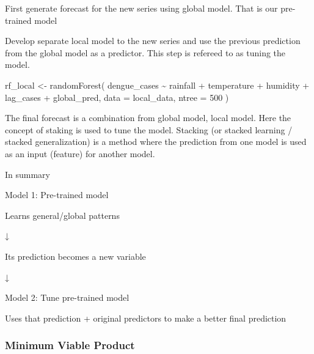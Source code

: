 \documentclass[
]{article}
\newenvironment{Shaded}{\begin{snugshade}}{\end{snugshade}}
\newcommand{\AttributeTok}[1]{\textcolor[rgb]{0.40,0.45,0.13}{#1}}
\newcommand{\DecValTok}[1]{\textcolor[rgb]{0.68,0.00,0.00}{#1}}
\newcommand{\FunctionTok}[1]{\textcolor[rgb]{0.28,0.35,0.67}{#1}}
\newcommand{\NormalTok}[1]{\textcolor[rgb]{0.00,0.23,0.31}{#1}}
\newcommand{\OtherTok}[1]{\textcolor[rgb]{0.00,0.23,0.31}{#1}}
\newcommand{\SpecialCharTok}[1]{\textcolor[rgb]{0.37,0.37,0.37}{#1}}
\begin{document}
First generate forecast for the new series using global model. That is
our pre-trained model

\begin{Shaded}
\end{Shaded}

Develop separate local model to the new series and use the previous
prediction from the global model as a predictor. This step is refereed
to as tuning the model.

\begin{Shaded}
\begin{Highlighting}[]
\NormalTok{rf\_local }\OtherTok{\textless{}{-}} \FunctionTok{randomForest}\NormalTok{(}
\NormalTok{  dengue\_cases }\SpecialCharTok{\textasciitilde{}}\NormalTok{ rainfall }\SpecialCharTok{+}\NormalTok{ temperature }\SpecialCharTok{+}\NormalTok{ humidity }\SpecialCharTok{+}
\NormalTok{    lag\_cases }\SpecialCharTok{+}\NormalTok{ global\_pred,}
  \AttributeTok{data =}\NormalTok{ local\_data,}
  \AttributeTok{ntree =} \DecValTok{500}
\NormalTok{)}
\end{Highlighting}
\end{Shaded}

The final forecast is a combination from global model, local model. Here
the concept of staking is used to tune the model. Stacking (or stacked
learning / stacked generalization) is a method where the prediction from
one model is used as an input (feature) for another model.

In summary

Model 1: Pre-trained model

Learns general/global patterns

↓

Its prediction becomes a new variable

↓

Model 2: Tune pre-trained model

Uses that prediction + original predictors to make a better final
prediction

\subsubsection{Minimum Viable Product}\label{minimum-viable-product}
\end{document}
